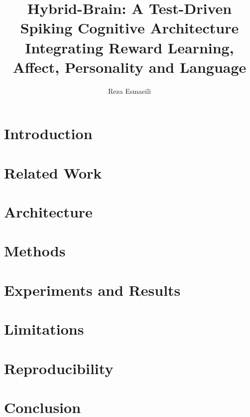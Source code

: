 \documentclass[11pt]{article}
\title{Hybrid-Brain: A Test-Driven Spiking Cognitive Architecture
        Integrating Reward Learning, Affect, Personality and Language}
\author{Reza Esmaeili}
\begin{document}
\maketitle
\begin{abstract}
\end{abstract}
\section{Introduction}
\section{Related Work}
\section{Architecture}
\section{Methods}
\section{Experiments and Results}
\section{Limitations}
\section{Reproducibility}
\section{Conclusion}
\end{document}
